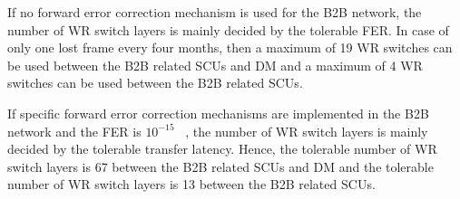 If no forward error correction mechanism is used for the B2B network, the number of WR switch layers is mainly decided by the tolerable FER. In case of only one lost frame every four months, then a maximum of 19 WR switches can be used between the B2B related SCUs and DM and a maximum of 4 WR switches can be used between the B2B related SCUs.


If specific forward error correction mechanisms are implemented in the B2B network and the FER is $10^{-15}$ ~\cite{prados_white_2011}, the number of WR switch layers is mainly decided by the tolerable transfer latency. Hence, the tolerable number of WR switch layers is 67 between the B2B related \gls{SCU}s and DM and the tolerable number of WR switch layers is 13 between the B2B related \gls{SCU}s.    

